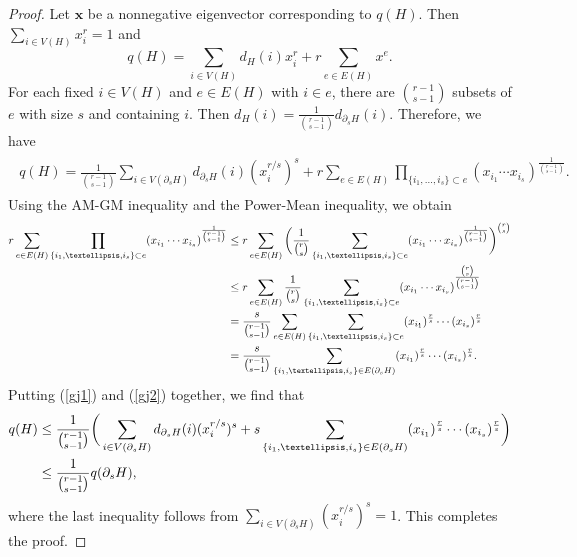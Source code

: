 \documentclass[10pt,a4paper]{amsart}
\begin{document}
\begin{proof}
Let $\mathbf{x}$ be a nonnegative eigenvector corresponding to $q(H)$. 
Then  $\sum_{i\in V(H)} x_i^r =1$ and 
\[  q(H)=\sum_{i\in V(H)}d_{H}(i)x_{i}^{r}+r\sum_{e\in E(H)}x^{e}. \]
For each fixed $i\in V(H)$ and $e\in E(H)$ with $i\in e$, 
there are ${r-1 \choose s-1}$ subsets of $e$ with size $s$ and containing $i$. 
Then $d_H(i)= \frac{1}{{r-1 \choose s-1}}d_{\partial_s H}(i)$. Therefore, we have 
\begin{align}\label{gj1}
\begin{split}
q(H) = \frac{1}{\binom{r-1}{s-1}}\sum_{i\in V(\partial_{s}H)}d_{\partial_{s}H}(i)(x_{i}^{r/s})^{s}
+r\sum_{e\in E(H)}\prod_{\{i_{1},\ldots,i_{s}\}\subset e} 
(x_{i_{1}}\cdots x_{i_{s}})^{\frac{1}{\binom{r-1}{s-1}}}.
 \end{split}
\end{align} 
Using the AM-GM inequality and the Power-Mean inequality, we obtain 
\begin{align}
r\sum_{e\in E(H)}\prod_{\{i_{1},\ldots,i_{s}\}\subset e}(x_{i_{1}}\cdots x_{i_{s}})^{\frac{1}{\binom{r-1}{s-1}}}
&\leq  r\sum_{e\in E(H)}\bigg(\frac{1}{\binom{r}{s}}\sum_{\{i_{1},\ldots,i_{s}\}\subset e}(x_{i_{1}}\cdots x_{i_{s}})^{\frac{1}{\binom{r-1}{s-1}}}\bigg)^{\binom{r}{s}} \notag \\
&\leq  r\sum_{e\in E(H)} \frac{1}{\binom{r}{s}}\sum_{\{i_{1},\ldots,i_{s}\}\subset e}(x_{i_{1}}\cdots x_{i_{s}})^{\frac{\binom{r}{s}}{\binom{r-1}{s-1}}}  \notag \\
&= \frac{s}{\binom{r-1}{s-1}}\sum_{e\in E(H)} \sum_{\{i_{1},\ldots,i_{s}\}\subset e}(x_{i_{1}})^{\frac{r}{s}}\cdots(x_{i_{s}})^{\frac{r}{s}} \notag \\
&= \frac{s}{\binom{r-1}{s-1}} \sum_{\{i_{1},\ldots,i_{s}\}\in E(\partial_{s} H)}(x_{i_{1}})^{\frac{r}{s}}\cdots(x_{i_{s}})^{\frac{r}{s}}. \label{gj2}
\end{align}
Putting (\ref{gj1}) and (\ref{gj2}) together, we find that
\begin{align*} \notag
q(H)&\leq \frac{1}{\binom{r-1}{s-1}}\bigg(\sum_{i\in V(\partial_{s}H)}d_{\partial_{s}H}(i)(x_{i}^{r/s})^{s}+
s\sum_{\{i_{1},\ldots,i_{s}\}\in E(\partial_{s} H)}(x_{i_{1}})^{\frac{r}{s}}\cdots(x_{i_{s}})^{\frac{r}{s}}\bigg)\\ \notag 
&\leq \frac{1}{\binom{r-1}{s-1}}q(\partial_{s} H),
\end{align*}
where the last inequality follows from $\sum_{i\in V(\partial_{s} H)}(x_{i}^{r/s})^{s}=1$. 
This completes the proof. 
\end{proof}
\end{document}
